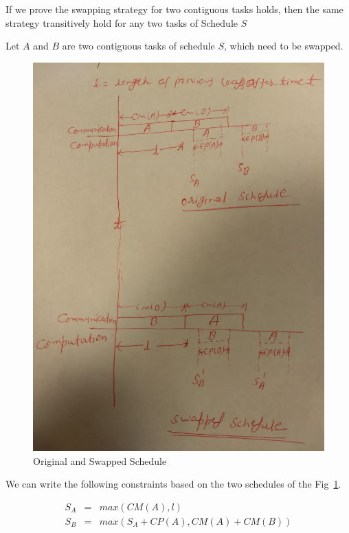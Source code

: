 \documentclass[runningheads]{llncs} %
\begin{document}
	\noindent If we prove the swapping strategy for two contiguous tasks holds, then the same strategy transitively hold for any two tasks of Schedule $S$ 
	
	
	Let $A$ and $B$ are two contiguous tasks of schedule $S$, which need to be swapped.
	\begin{figure}[htb]
		\centering
		\includegraphics[width=\textwidth, height=0.5\textheight, 
		keepaspectratio]{Figs/swappedSchedule.jpg}
		\caption{ \label{fig:bothSchedule} Original and Swapped Schedule}
	\end{figure}
	
	We can write the following constraints based on the two schedules of the Fig~\ref{fig:bothSchedule}.
	
	\begin{eqnarray*}
		S_A & = & max(CM(A), l) \\
		S_B & = & max(S_A + CP(A), CM(A) + CM(B))
	\end{eqnarray*}
	
\end{document}
